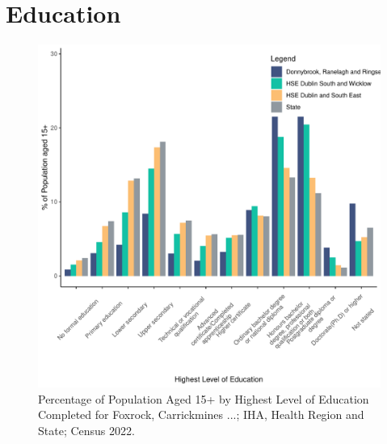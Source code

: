 \documentclass{article}
\begin{document}
\section{Education}\label{sect:Edu}
\begin{figure}[H]
	\centering
	\includegraphics[width = 120mm]{../figures/EduED.pdf}
	\caption{Percentage of Population Aged 15+ by Highest Level of Education Completed for Foxrock, Carrickmines ...; IHA, Health Region and State; Census 2022.}
	\label{fig:vbnv}
	\end{figure}
\end{document}
